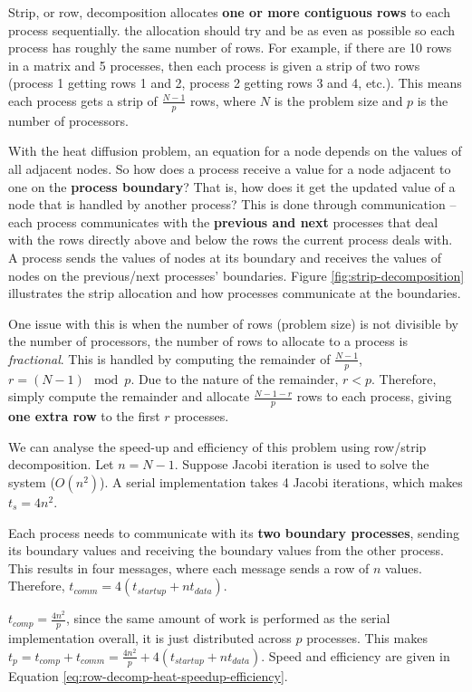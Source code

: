 \documentclass{article}
\begin{document}
Strip, or row, decomposition allocates \textbf{one or more contiguous rows} to each process sequentially. the allocation should try and be as even as possible so each process has roughly the same number of rows. For example, if there are 10 rows in a matrix and 5 processes, then each process is given a strip of two rows (process 1 getting rows 1 and 2, process 2 getting rows 3 and 4, etc.). This means each process gets a strip of $\frac{N - 1}{p}$ rows, where $N$ is the problem size and $p$ is the number of processors.

With the heat diffusion problem, an equation for a node depends on the values of all adjacent nodes. So how does a process receive a value for a node adjacent to one on the \textbf{process boundary}? That is, how does it get the updated value of a node that is handled by another process? This is done through communication -- each process communicates with the \textbf{previous and next} processes that deal with the rows directly above and below the rows the current process deals with. A process sends the values of nodes at its boundary and receives the values of nodes on the previous/next processes' boundaries. Figure \ref{fig:strip-decomposition} illustrates the strip allocation and how processes communicate at the boundaries.

One issue with this is when the number of rows (problem size) is not divisible by the number of processors, the number of rows to allocate to a process is \textit{fractional}. This is handled by computing the remainder of $\frac{N - 1}{p}$, $r = (N - 1) \mod p$. Due to the nature of the remainder, $r < p$. Therefore, simply compute the remainder and allocate $\frac{N - 1 - r}{p}$ rows to each process, giving \textbf{one extra row} to the first $r$ processes.

We can analyse the speed-up and efficiency of this problem using row/strip decomposition. Let $n = N -1$. Suppose Jacobi iteration is used to solve the system ($O(n^2)$). A serial implementation takes 4 Jacobi iterations, which makes $t_s = 4n^2$.

Each process needs to communicate with its \textbf{two boundary processes}, sending its boundary values and receiving the boundary values from the other process. This results in four messages, where each message sends a row of $n$ values. Therefore, $t_{comm} = 4(t_{startup} + nt_{data})$.

$t_{comp} = \frac{4n^2}{p}$, since the same amount of work is performed as the serial implementation overall, it is just distributed across $p$ processes. This makes $t_p = t_{comp}  + t_{comm} = \frac{4n^2}{p} + 4(t_{startup} + nt_{data})$. Speed and efficiency are given in Equation \ref{eq:row-decomp-heat-speedup-efficiency}.
\end{document}
